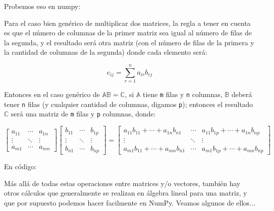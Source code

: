Probemos eso en numpy:


Para el caso bien genérico de multiplicar dos matrices, la regla a tener en cuenta es que el número de columnas de la primer matriz sea igual al número de filas de la segunda, y el resultado será otra matriz (con el número de filas de la primera y la cantidad de columnas de la segunda) donde cada elemento será:

\begin{equation*}
    c_{ij} = \sum_{r=1}^{n}a_{ir}b_{rj}
\end{equation*} 

Entonces en el caso genérico de $\mathbb{AB=C}$, si $\mathbb{A}$ tiene \verb|m| filas y \verb|n| columnas, $\mathbb{B}$ deberá tener \verb|n| filas (y cualquier cantidad de columnas, digamos \verb|p|); entonces el resultado $\mathbb{C}$ será una matriz de \verb|m| filas y \verb|p| columnas, donde:

\begin{equation*}
    \begin{bmatrix}
        a_{11} & \cdots & a_{1n}  \\
        \vdots & \ddots & \vdots  \\
        a_{m1} & \cdots & a_{mn}   
    \end{bmatrix}
    \begin{bmatrix}
        b_{11} & \cdots & b_{1p}  \\
        \vdots & \ddots & \vdots  \\
        b_{n1} & \cdots & b_{np}   
    \end{bmatrix} 
    =
    \begin{bmatrix}
        a_{11}b_{11} + \cdots + a_{1n}b_{n1} & \cdots & a_{11}b_{1p} + \cdots + a_{1n}b_{np} \\
        \vdots & \ddots & \vdots  \\
        a_{m1}b_{11} + \cdots + a_{mn}b_{n1} & \cdots & a_{m1}b_{1p} + \cdots + a_{mn}b_{np}
    \end{bmatrix}
\end{equation*} 


En código:


Más allá de todas estas operaciones entre matrices y/o vectores, también hay otros cálculos que generalmente se realizan en álgebra lineal para una matriz, y que por supuesto podemos hacer facilmente en NumPy. Veamos algunos de ellos...


